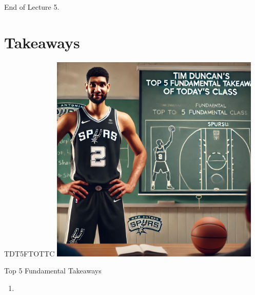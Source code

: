 \documentclass{beamer}
\begin{document}
\begin{frame}{}
    \centering
    \Huge End of Lecture 5.
\end{frame}

\section*{Takeaways}

\begin{frame}{TDT5FTOTTC}
    \centering
    \includegraphics[width=0.75\textwidth]{figures/tim.png}
\end{frame}

\begin{frame}{Top 5 Fundamental Takeaways}
    \small
    \begin{enumerate} \pause
        \item[5]
    \end{enumerate}
\end{frame}
\end{document}
